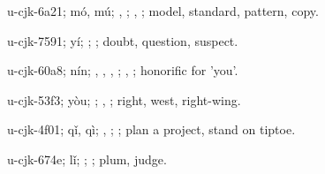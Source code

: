 \begin{multicols}{2}
{\cjkgGlue{}u-cjk-6a21; mó, mú; \cjkgGlue{}, \cjkgGlue{}; \cjkgGlue{}, \cjkgGlue{}; model, standard, pattern, copy.

\cjkgGlue{}u-cjk-7591; yí; \cjkgGlue{}\cjkgGlue{}\cjkgGlue{}; \cjkgGlue{}; doubt, question, suspect.

\cjkgGlue{}u-cjk-60a8; nín; \cjkgGlue{}, \cjkgGlue{}, \cjkgGlue{}, \cjkgGlue{}; \cjkgGlue{}, \cjkgGlue{}; honorific for 'you'.

\cjkgGlue{}u-cjk-53f3; yòu; \cjkgGlue{}; \cjkgGlue{}, \cjkgGlue{}; right, west, right-wing.

\cjkgGlue{}u-cjk-4f01; qǐ, qì; \cjkgGlue{}\cjkgGlue{}\cjkgGlue{}, \cjkgGlue{}\cjkgGlue{}\cjkgGlue{}; \cjkgGlue{}; plan a project, stand on tiptoe.

\cjkgGlue{}u-cjk-674e; lǐ; \cjkgGlue{}; \cjkgGlue{}; plum, judge.

}
\end{multicols}
